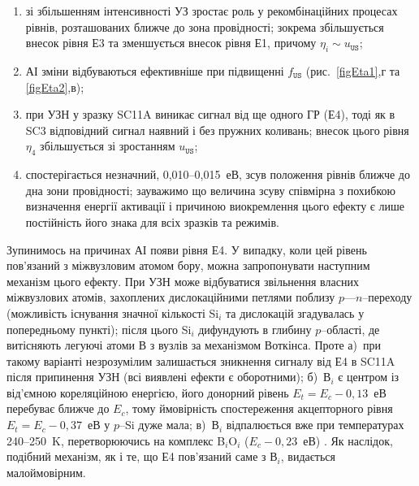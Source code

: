 \begin{enumerate}[label=\asbuk*),leftmargin=0em,itemindent=1.5em]
\item зі збільшенням інтенсивності УЗ зростає роль у рекомбінаційних процесах рівнів, розташованих ближче до зона провідності; зокрема збільшується внесок рівня Е3 та зменшується внесок рівня Е1, причому
$\eta_i\sim u_\mathtt{US}$;
\item АІ зміни відбуваються ефективніше при підвищенні $f_\mathtt{US}$ (рис.~\ref{figEta1},г та \ref{figEta2},в);
\item при УЗН у зразку SC11A виникає сигнал від ще одного ГР (Е4), тоді як в SC3 відповідний сигнал наявний і без пружних коливань; внесок цього рівня $\eta_4$ збільшується зі зростанням $u_\mathtt{US}$;
\item спостерігається незначний, 0,010--0,015~еВ, зсув положення рівнів ближче до дна зони провідності; зауважимо що величина зсуву співмірна з похибкою визначення енергії активації і причиною виокремлення цього ефекту є лише постійність його знака для всіх зразків та режимів.
\end{enumerate}

Зупинимось на причинах АІ появи рівня Е4.
У випадку, коли цей рівень пов'язаний з міжвузловим атомом бору, можна запропонувати наступним механізм цього ефекту.
При УЗН може відбуватися звільнення власних міжвузлових атомів, захоплених дислокаційними петлями поблизу $p$---$n$--переходу (можливість існування значної кількості Si$_i$ та дислокацій згадувалась у попередньому пункті);
після цього Si$_i$ дифундують в глибину $p$--області, де витісняють легуючі атоми В з вузлів за механізмом Воткінса.
Проте
а)~при такому варіанті незрозумілим залишається зникнення сигналу від Е4 в SC11A після припинення УЗН (всі виявлені ефекти є оборотними);
б)~В$_i$ є центром із від'ємною кореляційною енергією, його донорний рівень $E_t=E_c-0,13$~еВ \cite{Bi:Harris} перебуває ближче до $E_c$, тому ймовірність спостереження акцепторного рівня
$E_t=E_c-0,37$~еВ у $p$--Si дуже мала;
в)~В$_i$ відпалюється вже при температурах 240--250~K, перетворюючись на комплекс B$_i$O$_i$ ($E_c-0,23$~еВ) \cite{PhysRevB94}.
Як наслідок, подібний механізм, як і те, що Е4 пов'язаний саме з В$_i$, видається малоймовірним.

